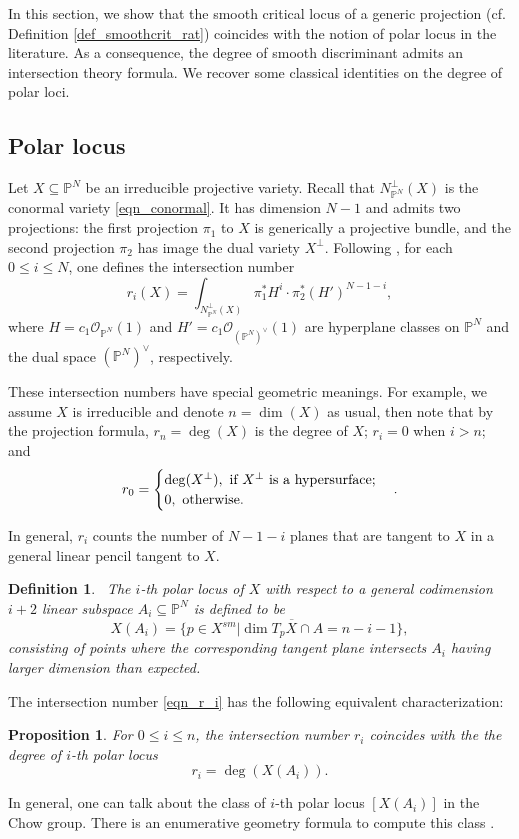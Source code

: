 \documentclass[12pt]{amsart}
\newtheorem{definition}[theorem]{Definition}
\newtheorem{proposition}[theorem]{Proposition}
\begin{document}
In this section, we show that the smooth critical locus of a generic projection (cf. Definition \ref{def_smoothcrit_rat}) coincides with the notion of polar locus in the literature. As a consequence, the degree of smooth discriminant admits an intersection theory formula. We recover some classical identities on the degree of polar loci.  

\subsection{Polar locus}
Let $X\subseteq \mathbb P^{N}$ be an irreducible projective variety. Recall that $N^{\perp}_{\mathbb P^N}(X)$ is the conormal variety \eqref{eqn_conormal}. It has dimension $N-1$ and admits two projections: the first projection $\pi_1$ to $X$ is generically a projective bundle, and the second projection $\pi_2$ has image the dual variety $X^{\perp}$. Following \cite[Cha. II]{Kle86}, for each $0\le i\le N$, one defines the intersection number
\begin{equation}\label{eqn_r_i}
    r_i(X)=\int_{N^{\perp}_{\mathbb P^N}(X)}\pi_1^*H^i\cdot \pi_2^*(H')^{N-1-i},
\end{equation}
 where $H=c_1\mathcal{O}_{\mathbb P^N}(1)$ and $H'=c_1\mathcal{O}_{(\mathbb P^N)^{\vee}}(1)$ are hyperplane classes on $\mathbb P^N$ and the dual space $(\mathbb P^N)^{\vee}$, respectively. 
 
 These intersection numbers have special geometric meanings. For example, we assume $X$ is irreducible and denote $n=\dim(X)$ as usual, then note that by the projection formula, $r_n=\deg(X)$ is the degree of $X$; $r_i=0$ when $i>n$; and 
 \begin{equation*}
r_0=\begin{cases}\deg(X^{\perp}), \ \textup{if}\  X^{\perp}\ \textup{is a hypersurface};\\
0,\ \textup{otherwise}.
\end{cases}.    
 \end{equation*}
 
  In general, $r_i$ counts the number of $N-1-i$ planes that are tangent to $X$ in a general linear pencil tangent to $X$.  
  
  \begin{definition}\textup{\cite[p. 186]{Kle86}}\normalfont 
  \ The \textit{$i$-th polar locus} of $X$ with respect to a general codimension $i+2$ linear subspace $A_i\subseteq \mathbb P^N$ is defined to be 
$$X(A_i)=\overline{\{p\in X^{sm}|\dim T_pX\cap A=n-i-1\}},$$
consisting of points where the corresponding tangent plane intersects $A_i$ having larger dimension than expected. 
  \end{definition}
 The intersection number \eqref{eqn_r_i} has the following equivalent characterization:
\begin{proposition}\cite[p.187]{Kle86} For $0\le i\le n$, the intersection number $r_i$ coincides with the the degree of $i$-th polar locus $$r_i=\deg(X(A_i)).$$
\end{proposition}
  In general, one can talk about the class of $i$-th polar locus $[X(A_i)]$ in the Chow group. There is an enumerative geometry formula to compute this class \cite[IV,21]{Kle77}. 
\end{document}
